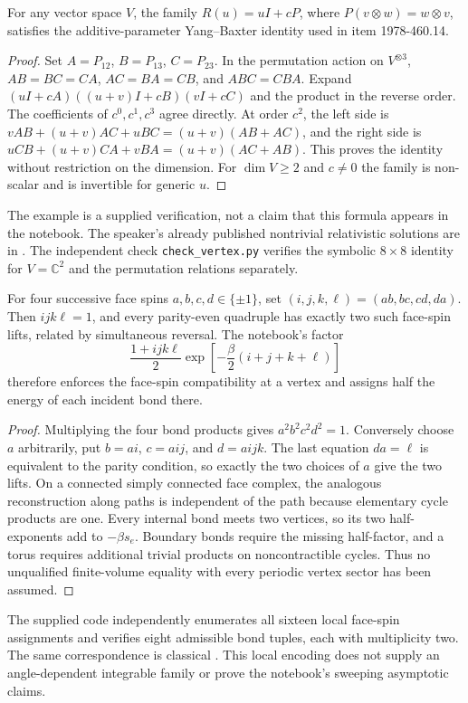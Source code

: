 \begin{proposition}\ours{}
For any vector space \(V\), the family \(R(u)=uI+cP\), where \(P(v\otimes w)=w\otimes v\), satisfies the additive-parameter Yang--Baxter identity used in item 1978-460.14.
\end{proposition}
\begin{proof}
Set \(A=P_{12}\), \(B=P_{13}\), \(C=P_{23}\). In the permutation action on \(V^{\otimes3}\),
\(AB=BC=CA\), \(AC=BA=CB\), and \(ABC=CBA\).
Expand \((uI+cA)((u+v)I+cB)(vI+cC)\) and the product in the reverse order. The coefficients of \(c^0,c^1,c^3\) agree directly. At order \(c^2\), the left side is
\(vAB+(u+v)AC+uBC=(u+v)(AB+AC)\), and the right side is
\(uCB+(u+v)CA+vBA=(u+v)(AC+AB)\). This proves the identity without restriction on the dimension. For \(\dim V\ge2\) and \(c\ne0\) the family is non-scalar and is invertible for generic \(u\).
\end{proof}
The example is a supplied verification, not a claim that this formula appears in the notebook. The speaker's already published nontrivial relativistic solutions are in \citet[Sec.~3]{zamolodchikovzamolodchikov1978on}. The independent check \texttt{check\_vertex.py} verifies the symbolic \(8\times8\) identity for \(V=\mathbb C^2\) and the permutation relations separately.

\begin{proposition}\ours{}
For four successive face spins \(a,b,c,d\in\{\pm1\}\), set
\((i,j,k,\ell)=(ab,bc,cd,da)\). Then \(ijk\ell=1\), and every parity-even quadruple has exactly two such face-spin lifts, related by simultaneous reversal. The notebook's factor
\[
 \frac{1+ijk\ell}{2}\exp\!\left[-\frac\beta2(i+j+k+\ell)\right]
\]
therefore enforces the face-spin compatibility at a vertex and assigns half the energy of each incident bond there.
\end{proposition}
\begin{proof}
Multiplying the four bond products gives \(a^2b^2c^2d^2=1\). Conversely choose \(a\) arbitrarily, put \(b=ai\), \(c=aij\), and \(d=aijk\). The last equation \(da=\ell\) is equivalent to the parity condition, so exactly the two choices of \(a\) give the two lifts. On a connected simply connected face complex, the analogous reconstruction along paths is independent of the path because elementary cycle products are one. Every internal bond meets two vertices, so its two half-exponents add to \(-\beta s_e\). Boundary bonds require the missing half-factor, and a torus requires additional trivial products on noncontractible cycles. Thus no unqualified finite-volume equality with every periodic vertex sector has been assumed.
\end{proof}
The supplied code independently enumerates all sixteen local face-spin assignments and verifies eight admissible bond tuples, each with multiplicity two. The same correspondence is classical \citep[Secs.~10.3 and 11.5]{baxter1982exactly}. This local encoding does not supply an angle-dependent integrable family or prove the notebook's sweeping asymptotic claims.
